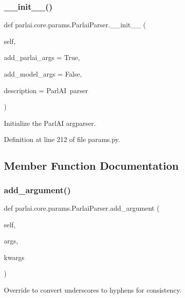 \subsubsection{\texorpdfstring{\+\_\+\+\_\+init\+\_\+\+\_\+()}{\_\_init\_\_()}}
{\footnotesize\ttfamily def parlai.\+core.\+params.\+Parlai\+Parser.\+\_\+\+\_\+init\+\_\+\+\_\+ (\begin{DoxyParamCaption}\item[{}]{self,  }\item[{}]{add\+\_\+parlai\+\_\+args = {\ttfamily True},  }\item[{}]{add\+\_\+model\+\_\+args = {\ttfamily False},  }\item[{}]{description = {\ttfamily \textquotesingle{}ParlAI~parser\textquotesingle{}} }\end{DoxyParamCaption})}

\begin{DoxyVerb}Initialize the ParlAI argparser.\end{DoxyVerb}
 

Definition at line 212 of file params.\+py.



\subsection{Member Function Documentation}
\mbox{\label{classparlai_1_1core_1_1params_1_1ParlaiParser_a3ecf246ac5ed40769d313a2db962b43e}} 
\subsubsection{\texorpdfstring{add\+\_\+argument()}{add\_argument()}}
{\footnotesize\ttfamily def parlai.\+core.\+params.\+Parlai\+Parser.\+add\+\_\+argument (\begin{DoxyParamCaption}\item[{}]{self,  }\item[{}]{args,  }\item[{}]{kwargs }\end{DoxyParamCaption})}

\begin{DoxyVerb}Override to convert underscores to hyphens for consistency.\end{DoxyVerb}
 

